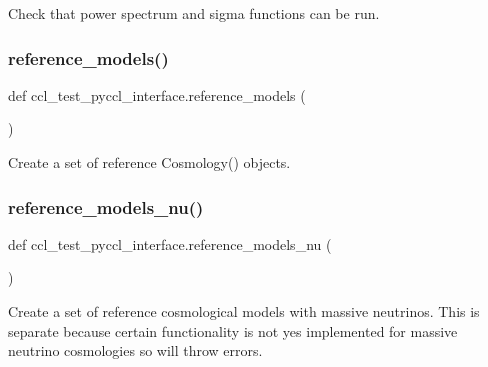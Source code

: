 \begin{DoxyVerb}Check that power spectrum and sigma functions can be run.
\end{DoxyVerb}
 \mbox{\label{namespaceccl__test__pyccl__interface_af12cc81b73f2b986dbddf49f0b57759a}} 
\subsubsection{\texorpdfstring{reference\+\_\+models()}{reference\_models()}}
{\footnotesize\ttfamily def ccl\+\_\+test\+\_\+pyccl\+\_\+interface.\+reference\+\_\+models (\begin{DoxyParamCaption}{ }\end{DoxyParamCaption})}

\begin{DoxyVerb}Create a set of reference Cosmology() objects.
\end{DoxyVerb}
 \mbox{\label{namespaceccl__test__pyccl__interface_a2d1bcf258dbc29d3e39ce74e3dff711e}} 
\subsubsection{\texorpdfstring{reference\+\_\+models\+\_\+nu()}{reference\_models\_nu()}}
{\footnotesize\ttfamily def ccl\+\_\+test\+\_\+pyccl\+\_\+interface.\+reference\+\_\+models\+\_\+nu (\begin{DoxyParamCaption}{ }\end{DoxyParamCaption})}

\begin{DoxyVerb}Create a set of reference cosmological models with massive neutrinos.
This is separate because certain functionality is not yes implemented
for massive neutrino cosmologies so will throw errors.
\end{DoxyVerb}
 \mbox{\label{namespaceccl__test__pyccl__interface_ac8e0f5304f7823f08dd48bd16736cbde}} 
